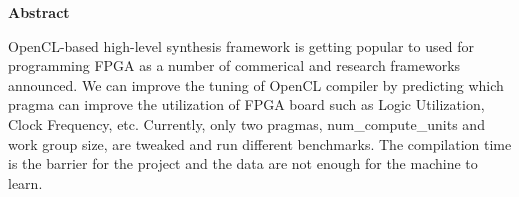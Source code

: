 \thispagestyle{plain}
\begin{center}
    \textbf{Abstract}
\end{center}
OpenCL-based high-level synthesis framework is getting popular to used for programming FPGA as a number of commerical and research frameworks announced. We can improve the tuning of OpenCL compiler by predicting which pragma can improve the utilization of FPGA board such as Logic Utilization, Clock Frequency, etc. Currently, only two pragmas, num\_compute\_units and work group size, are tweaked and run different benchmarks. The compilation time is the barrier for the project and the data are not enough for the machine to learn.